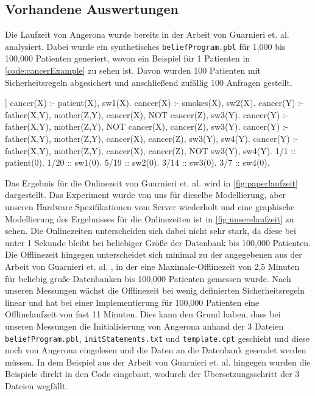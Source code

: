 \documentclass[german,version-2020-11]{uzl-thesis}
\begin{document}
\subsection{Vorhandene Auswertungen}
Die Laufzeit von Angerona wurde bereits in der Arbeit von Guarnieri et. al. \cite{guarnieri2017securing} analysiert. Dabei wurde ein synthetisches \texttt{beliefProgram.pbl} für 1,000 bis 100,000 Patienten generiert, wovon ein Beispiel für 1 Patienten in \autoref{code:cancerExample} zu sehen ist. Davon wurden 100 Patienten mit Sicherheitsregeln abgesichert und anschließend zufällig 100 Anfragen gestellt. \\ 
\begin{Pseudocode}[caption={\texttt{beliefProgram.pbl} für das Beispiel aus \cite{6}}, label={code:cancerExample}]]
cancer(X) :- patient(X), sw1(X).
cancer(X) :- smokes(X), sw2(X).
cancer(Y) :- father(X,Y), mother(Z,Y), cancer(X), NOT cancer(Z), sw3(Y).
cancer(Y) :- father(X,Y), mother(Z,Y), NOT cancer(X), cancer(Z), sw3(Y).
cancer(Y) :- father(X,Y), mother(Z,Y), cancer(X), cancer(Z), sw3(Y), sw4(Y).
cancer(Y) :- father(X,Y), mother(Z,Y), cancer(X), cancer(Z), NOT sw3(Y), sw4(Y).
1/1 :: patient(0).
1/20 :: sw1(0).
5/19 :: sw2(0).
3/14 :: sw3(0).
3/7 :: sw4(0).
\end{Pseudocode}
Das Ergebnis für die Onlinezeit von Guarnieri et. al. \cite{guarnieri2017securing} wird in \autoref{fig:paperlaufzeit} dargestellt. Das Experiment wurde von uns für dieselbe Modellierung, aber unseren Hardware Spezifikationen vom Server wiederholt und eine graphische Modellierung des Ergebnisses für die Onlinezeiten ist in \autoref{fig:unserelaufzeit} zu sehen. Die Onlinezeiten unterscheiden sich dabei nicht sehr stark, da diese bei unter 1 Sekunde bleibt bei beliebiger Größe der Datenbank bis 100,000 Patienten. \\
Die Offlinezeit hingegen unterscheidet sich minimal zu der angegebenen aus der Arbeit von Guarnieri et. al. \cite{guarnieri2017securing}, in der eine Maximale-Offlinezeit von 2,5 Minuten für beliebig große Datenbanken bis 100,000 Patienten gemessen wurde. Nach unseren Messungen wächst die Offlinezeit bei wenig definierten Sicherheitsregeln linear und hat bei einer Implementierung für 100,000 Patienten eine Offlinelaufzeit von fast 11 Minuten. Dies kann den Grund haben, dass bei unseren Messungen die Initialisierung von Angerona anhand der 3 Dateien \texttt{beliefProgram.pbl}, \texttt{initStatements.txt} und \texttt{template.cpt} geschieht und diese noch von Angerona eingelesen und die Daten an die Datenbank gesendet werden müssen. In dem Beispiel aus der Arbeit von Guarnieri et. al. \cite{guarnieri2017securing} hingegen wurden die Beispiele direkt in den Code eingebaut, wodurch der Übersetzungsschritt der 3 Dateien wegfällt.\\  
\end{document}
